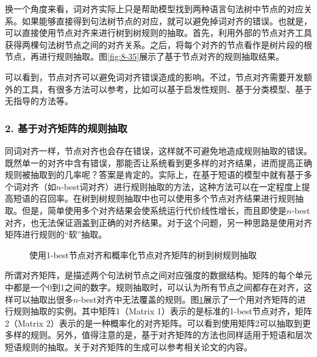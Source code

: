 \vspace{-1.0em}
\parinterval 换一个角度来看，词对齐实际上只是帮助模型找到两种语言句法树中节点的对应关系。如果能够直接得到句法树节点的对应，就可以避免掉词对齐的错误。也就是，可以直接使用节点对齐来进行树到树规则的抽取。首先，利用外部的节点对齐工具获得两棵句法树节点之间的对齐关系。之后，将每个对齐的节点看作是树片段的根节点，再进行规则抽取。图\ref{fig:8-35}展示了基于节点对齐的规则抽取结果。

\parinterval 可以看到，节点对齐可以避免词对齐错误造成的影响。不过，节点对齐需要开发额外的工具，有很多方法可以参考，比如可以基于启发性规则、基于分类模型、基于无指导的方法等。


\subsubsection{2. 基于对齐矩阵的规则抽取}

\parinterval 同词对齐一样，节点对齐也会存在错误，这样就不可避免地造成规则抽取的错误。既然单一的对齐中含有错误，那能否让系统看到更多样的对齐结果，进而提高正确规则被抽取到的几率呢？答案是肯定的。实际上，在基于短语的模型中就有基于多个词对齐（如$n$-best词对齐）进行规则抽取的方法，这种方法可以在一定程度上提高短语的召回率。在树到树规则抽取中也可以使用多个节点对齐结果进行规则抽取。但是，简单使用多个对齐结果会使系统运行代价线性增长，而且即使是$n$-best对齐，也无法保证涵盖到正确的对齐结果。对于这个问题，另一种思路是使用对齐矩阵进行规则的“软”抽取。
\vspace{-1em}
\begin{figure}[htp]
\centering

\setlength{\abovecaptionskip}{-0.5em}
\caption{使用1-best节点对齐和概率化节点对齐矩阵的树到树规则抽取}
\label{fig:8-36}
\end{figure}

\vspace{-0.5em}
\parinterval 所谓对齐矩阵，是描述两个句法树节点之间对应强度的数据结构。矩阵的每个单元中都是一个0到1之间的数字。规则抽取时，可以认为所有节点之间都存在对齐，这样可以抽取出很多$n$-best对齐中无法覆盖的规则。图\ref{fig:8-36}展示了一个用对齐矩阵的进行规则抽取的实例。其中矩阵1（Matrix 1）表示的是标准的1-best节点对齐，矩阵2（Matrix 2）表示的是一种概率化的对齐矩阵。可以看到使用矩阵2可以抽取到更多样的规则。另外，值得注意的是，基于对齐矩阵的方法也同样适用于短语和层次短语规则的抽取。关于对齐矩阵的生成可以参考相关论文的内容。

